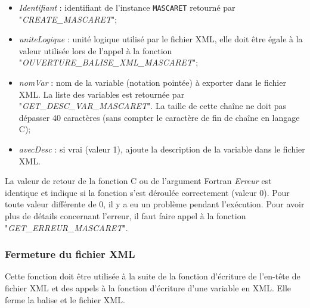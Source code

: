 \documentclass[a4paper,11pt]{article}
\begin{document}
 \begin{itemize}
 
    \item \textit{Identifiant} : identifiant de l'instance \texttt{MASCARET} retourn\'e par "\textit{CREATE\_MASCARET}";
    
    \vspace{0.5cm}
    
    \item \textit{uniteLogique} : unit\'e logique utilis\'e par le fichier XML, elle doit \^etre \'egale \`a la valeur utilis\'ee lors de l'appel \`a la fonction "\textit{OUVERTURE\_BALISE\_XML\_MASCARET}";
    
    \vspace{0.5cm}
    
    \item \textit{nomVar} : nom de la variable (notation point\'ee) \`a exporter dans le fichier XML. La liste des variables est retourn\'ee par "\textit{GET\_DESC\_VAR\_MASCARET}". La taille de cette cha\^ine ne doit pas d\'epasser 40 caract\`eres (sans compter le caract\`ere de fin de cha\^ine en langage C);
    
    \vspace{0.5cm}
    
    \item \textit{avecDesc} : si vrai (valeur 1), ajoute la description de la variable dans le fichier XML.
    
 \end{itemize}
 
 \vspace{0.5cm}
 
 La valeur de retour de la fonction C ou de l'argument Fortran \textit{Erreur} est identique et indique si la fonction s'est d\'eroul\'ee correctement (valeur 0). Pour toute valeur diff\'erente de 0, il y a eu un probl\`eme pendant l'ex\'ecution. Pour avoir plus de d\'etails concernant l'erreur, il faut faire appel \`a la fonction "\textit{GET\_ERREUR\_MASCARET}".

\subsubsection{Fermeture du fichier XML}

 Cette fonction doit \^etre utilis\'ee \`a la suite de la fonction d'\'ecriture de l'en-t\^ete de fichier XML et des appels \`a la fonction d'\'ecriture d'une variable en XML. Elle ferme la balise et le fichier XML.
 
\end{document}
